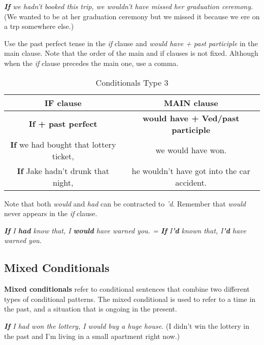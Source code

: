 \documentclass[hidelinks,10pt,a4paper]{article}
\begin{document}
\begin{center}
	\textit{\textbf{If} we hadn't booked this trip, we wouldn't have missed her graduation ceremony.} (We wanted to be at her graduation ceremony but we missed it because we ere on a trp somewhere else.)
\end{center}

Use the past perfect tense in the \textit{if} clause and \textit{would have + past participle} in the main clause. Note that the order of the main and if clauses is not fixed. Although when the \textit{if} clause precedes the main one, use a comma.

\begin{table}[h]
\begin{center}
\begin{tabular}{|c|c|}
	\hline
	\textbf{IF clause} & \textbf{MAIN clause} \\ \hline
	\textbf{If + past perfect} & \textbf{would have + Ved/past participle} \\ \hline
	\textbf{If} we had bought that lottery ticket, & we would have won. \\ \hline
	\textbf{If} Jake hadn't drunk that night, & he wouldn't have got into the car accident. \\ \hline
\end{tabular}
\end{center}
\caption{Conditionals Type 3} \label{tab:ct3t}
\end{table}

Note that both \textit{would} and \textit{had} can be contracted to \textit{'d}. Remember that \textit{would} never appears in the \textit{if} clause.

\begin{center}
	\textit{\textbf{If} I \textbf{had} know that, I \textbf{would} have warned you. = \textbf{If} I\textbf{'d} known that, I\textbf{'d} have warned you.}
\end{center}

\subsection{Mixed Conditionals}
\textbf{Mixed conditionals} refer to conditional sentences that combine two different types of conditional patterns. The mixed conditional is used to refer to a time in the past, and a situation that is ongoing in the present.

\begin{center}
	\textit{\textbf{If} I had won the lottery, I would buy a huge house.} (I didn't win the lottery in the past and I'm living in a small apartment right now.)
\end{center}
\end{document}
